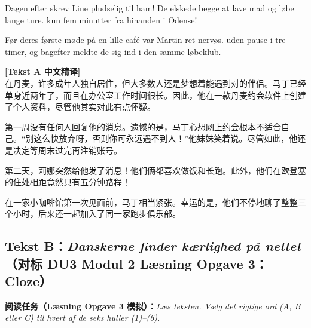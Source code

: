 Dagen efter skrev Line pludselig til ham! De elskede begge at lave mad og løbe lange ture.   kun fem minutter fra hinanden i Odense!

Før deres første møde på en lille café var Martin ret nervøs.   uden pause i tre timer, og bagefter meldte de sig ind i den samme løbeklub.

\begin{transbox}
\small
\textbf{\color{NCDTeal}[Tekst A 中文精译]}\\
在丹麦，许多成年人独自居住，但大多数人还是梦想着能遇到对的伴侣。马丁已经单身近两年了，而且在办公室工作时间很长。因此，他在一款丹麦约会软件上创建了个人资料，尽管他其实对此有点怀疑。

第一周没有任何人回复他的消息。遗憾的是，马丁心想网上约会根本不适合自己。“别这么快放弃呀，否则你可永远遇不到人！”他妹妹笑着说。尽管如此，他还是决定等周末过完再注销账号。

第二天，莉娜突然给他发了消息！他们俩都喜欢做饭和长跑。此外，他们在欧登塞的住处相距竟然只有五分钟路程！

在一家小咖啡馆第一次见面前，马丁相当紧张。幸运的是，他们不停地聊了整整三个小时，后来还一起加入了同一家跑步俱乐部。
\end{transbox}

\subsection*{Tekst B：\textit{Danskerne finder kærlighed på nettet}（对标 DU3 Modul 2 Læsning Opgave 3：Cloze）}

\textbf{阅读任务（Læsning Opgave 3 模拟）：}\textit{Læs teksten. Vælg det rigtige ord (A, B eller C) til hvert af de seks huller (1)--(6).}

